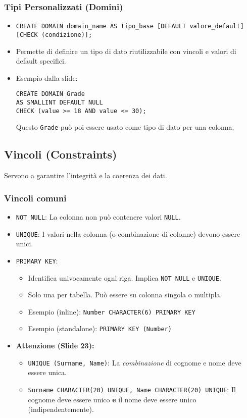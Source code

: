 	\subsubsection{Tipi Personalizzati (Domini)}
	\begin{itemize}
		\item \texttt{CREATE DOMAIN domain\_name AS tipo\_base [DEFAULT valore\_default] [CHECK (condizione)];}
		\item Permette di definire un tipo di dato riutilizzabile con vincoli e valori di default specifici.
		\item Esempio dalla slide:
		\begin{verbatim}
CREATE DOMAIN Grade
AS SMALLINT DEFAULT NULL
CHECK (value >= 18 AND value <= 30);
		\end{verbatim}
		Questo \texttt{Grade} può poi essere usato come tipo di dato per una colonna.
	\end{itemize}
	
	\subsection{Vincoli (Constraints)}
	Servono a garantire l'integrità e la coerenza dei dati.
	\subsubsection{Vincoli comuni}
	\begin{itemize}
		\item \texttt{NOT NULL}: La colonna non può contenere valori \texttt{NULL}.
		\item \texttt{UNIQUE}: I valori nella colonna (o combinazione di colonne) devono essere unici.
		\item \texttt{PRIMARY KEY}:
		\begin{itemize}
			\item Identifica univocamente ogni riga. Implica \texttt{NOT NULL} e \texttt{UNIQUE}.
			\item Solo una per tabella. Può essere su colonna singola o multipla.
			\item Esempio (inline): \texttt{Number CHARACTER(6) PRIMARY KEY}
			\item Esempio (standalone): \texttt{PRIMARY KEY (Number)}
		\end{itemize}
		\item \textbf{Attenzione (Slide 23):}
		\begin{itemize}
			\item \texttt{UNIQUE (Surname, Name)}: La \textit{combinazione} di cognome e nome deve essere unica.
			\item \texttt{Surname CHARACTER(20) UNIQUE, Name CHARACTER(20) UNIQUE}: Il cognome deve essere unico \textbf{e} il nome deve essere unico (indipendentemente).
		\end{itemize}
	\end{itemize}
